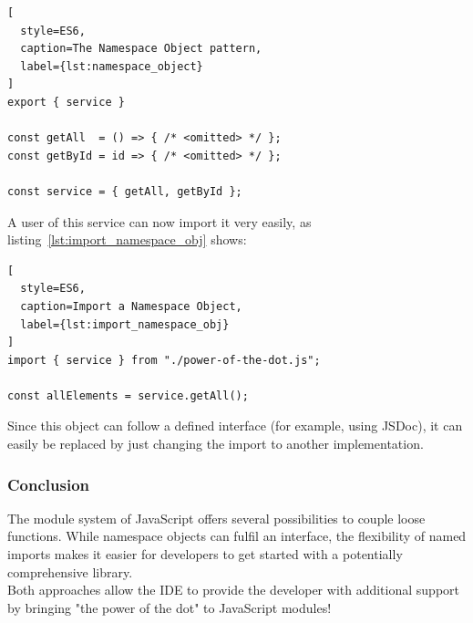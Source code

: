 \begin{lstlisting}[
  style=ES6,
  caption=The Namespace Object pattern,
  label={lst:namespace_object}
]
export { service }

const getAll  = () => { /* <omitted> */ };
const getById = id => { /* <omitted> */ };

const service = { getAll, getById };
\end{lstlisting}

A user of this service can now import it very easily, as
listing~\ref{lst:import_namespace_obj} shows:

\begin{lstlisting}[
  style=ES6,
  caption=Import a Namespace Object,
  label={lst:import_namespace_obj}
]
import { service } from "./power-of-the-dot.js";

const allElements = service.getAll();
\end{lstlisting}

Since this object can follow a defined interface (for example, using JSDoc), it
can easily be replaced by just changing the import to another implementation.

\subsubsection{Conclusion} %
\label{subsub:Power_of_the_dot_Conclusion}
The module system of JavaScript offers several possibilities to couple
loose functions. While namespace objects can fulfil an interface, the
flexibility of named imports makes it easier for developers to get started with
a potentially comprehensive library. \\ 
Both approaches allow the IDE to provide the developer with additional support by
bringing "the power of the dot" to JavaScript modules!

